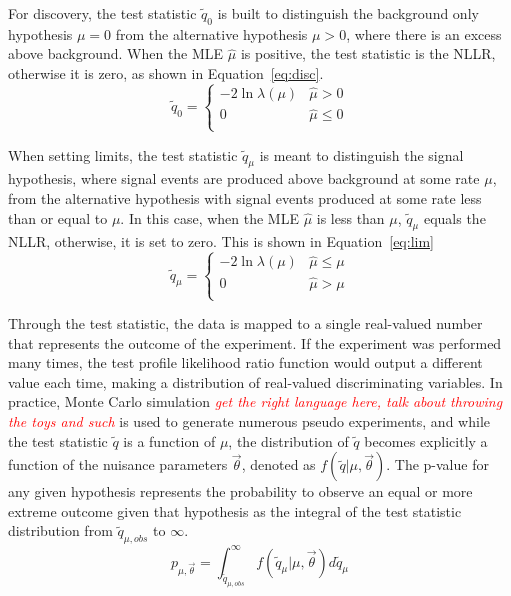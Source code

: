 For discovery, the test statistic $\tilde{q}_0$ is built to distinguish the background only hypothesis $\mu=0$ from the alternative hypothesis $\mu>0$, where there is an excess above background.  When the MLE $\hat{\mu}$ is positive, the test statistic is the NLLR, otherwise it is zero, as shown in Equation~\ref{eq:disc}.
\begin{equation}
\tilde{q}_0=
 \begin{cases} 
      -2\ln\lambda(\mu) & \hat{\mu}> 0 \\
      0 & \hat{\mu}\leq 0 \\
   \end{cases}
   \label{eq:disc}
\end{equation}

When setting limits, the test statistic $\tilde{q}_\mu$ is meant to distinguish the signal hypothesis, where signal events are produced above background at some rate $\mu$, from the alternative hypothesis with signal events produced at some rate less than or equal to $\mu$.  In this case, when the MLE $\hat{\mu}$ is less than $\mu$, $\tilde{q}_\mu$ equals the NLLR, otherwise, it is set to zero.  This is shown in Equation~\ref{eq:lim}
\begin{equation}
\tilde{q}_\mu=
 \begin{cases} 
      -2\ln\lambda(\mu) & \hat{\mu}\leq\mu  \\
      0 & \hat{\mu}>\mu \\
   \end{cases}
   \label{eq:lim}
\end{equation}

Through the test statistic, the data is mapped to a single real-valued number that represents the outcome of the experiment.  If the experiment was performed many times, the test profile likelihood ratio function would output a different value each time, making a distribution of real-valued discriminating variables.  In practice, Monte Carlo simulation \textcolor{red}{\textit{get the right language here, talk about throwing the toys and such}} is used to generate numerous pseudo experiments, and while the test statistic $\tilde{q}$ is a function of $\mu$, the distribution of $\tilde{q}$ becomes explicitly a function of the nuisance parameters $\vec{\theta}$, denoted as $f(\tilde{q}|\mu,\vec{\theta})$.  The p-value for any given hypothesis represents the probability to observe an equal or more extreme outcome given that hypothesis as the integral of the test statistic distribution from $\tilde{q}_{\mu,obs}$ to $\infty$.  
\begin{equation}
p_{\mu,\vec{\theta}}=\int_{\tilde{q}_{\mu,obs}}^\infty f(\tilde{q}_\mu|\mu,\vec{\theta}) d\tilde{q}_\mu
\label{eq:p0}
\end{equation}

